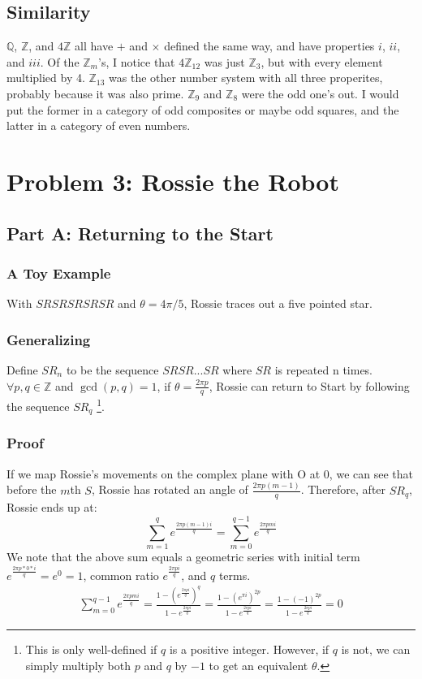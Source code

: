 \documentclass{article}
\begin{document}
  \subsection{Similarity}
  $\mathbb{Q}$, $\mathbb{Z}$, and $4\mathbb{Z}$ all have $+$ and $\times$ defined the same way, and have properties $i$, $ii$, and $iii$.
  Of the $\mathbb{Z}_m$'s, I notice that $4\mathbb{Z}_{12}$ was just $\mathbb{Z}_3$, but with every element multiplied by 4. $\mathbb{Z}_{13}$ was the other number system with all three properites, probably because it was also prime.
  $\mathbb{Z}_9$ and $\mathbb{Z}_8$ were the odd one's out. I would put the former in a category of odd composites or maybe odd squares, and the latter in a category of even numbers.
  \section{Problem 3: Rossie the Robot}
  \subsection{Part A: Returning to the Start}
  \subsubsection{A Toy Example}
  With $SRSRSRSRSR$ and $\theta = 4\pi/5$, Rossie traces out a five pointed star.
  \subsubsection{Generalizing}
  Define $SR_n$ to be the sequence $SRSR...SR$ where $SR$ is repeated n times. $\forall p, q \in \mathbb{Z}$ and $\gcd(p,q) = 1$, if $\theta = \frac{2\pi p}{q}$, Rossie can return to Start by following the sequence $SR_q$ \footnote{This is only well-defined if $q$ is a positive integer. However, if $q$ is not, we can simply multiply both $p$ and $q$ by $-1$ to get an equivalent $\theta$.}.
  \subsubsection{Proof}
   If we map Rossie's movements on the complex plane with O at 0, we can see that before the $m$th $S$, Rossie has rotated an angle of $\frac{2\pi p(m-1)}{q}$. Therefore, after $SR_q$, Rossie ends up at:
  \begin{equation}
    \sum^{q}_{m=1}e^{\frac{2\pi p(m-1)i}{q}} = \sum^{q-1}_{m=0}e^{\frac{2\pi pmi}{q}}
  \end{equation}
  We note that the above sum equals a geometric series with initial term $e^{\frac{2\pi p*0*i}{q}} = e^0 = 1$, common ratio $e^{\frac{2\pi pi}{q}}$, and $q$ terms.
  \begin{align}
    \sum^{q-1}_{m=0}e^{\frac{2\pi pmi}{q}} = \frac{1-(e^{\frac{2\pi pi}{q}})^q}{1-e^{\frac{2\pi pi}{q}}}
    = \frac{1-(e^{\pi i})^{2p}}{1 - e^{\frac{2\pi pi}{q}}}
    = \frac{1-(-1)^{2p}}{1 - e^{\frac{2\pi pi}{q}}}
    = 0
  \end{align}
  
\end{document}
